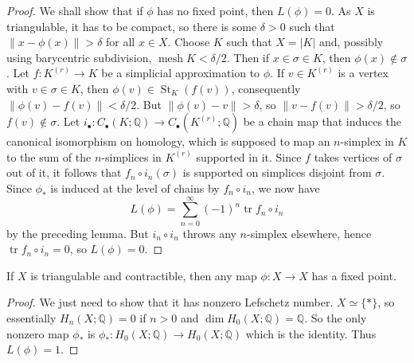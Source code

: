 \begin{proof}
    We shall show that if $\phi$ has no fixed point, then $L(\phi)=0$.
    As $X$ is triangulable, it has to be compact, so there is some $\delta>0$ such that $\|x-\phi(x)\|>\delta$ for all $x\in X$.
    Choose $K$ such that $X=|K|$ and, possibly using barycentric subdivision, $\operatorname{mesh}K<\delta/2$.
    Then if $x\in\sigma\in K$, then $\phi(x)\notin\sigma$.
    Let $f:K^{(r)}\to K$ be a simplicial approximation to $\phi$.
    If $v\in K^{(r)}$ is a vertex with $v\in\sigma\in K$, then $\phi(v)\in\operatorname{St}_K(f(v))$, consequently $\|\phi(v)-f(v)\|<\delta/2$.
    But $\|\phi(v)-v\|>\delta$, so $\|v-f(v)\|>\delta/2$, so $f(v)\notin\sigma$.
    Let $i_\bullet:C_\bullet(K;\mathbb Q)\to C_\bullet(K^{(r)};\mathbb Q)$ be a chain map that induces the canonical isomorphism on homology, which is supposed to map an $n$-simplex in $K$ to the sum of the $n$-simplices in $K^{(r)}$ supported in it.
    Since $f$ takes vertices of $\sigma$ out of it, it follows that $f_n\circ i_n(\sigma)$ is supported on simplices disjoint from $\sigma$.\\
    Since $\phi_\ast$ is induced at the level of chains by $f_n\circ i_n$, we now have
    $$L(\phi)=\sum_{n=0}^\infty(-1)^n\operatorname{tr}f_n\circ i_n$$
    by the preceding lemma.
    But $i_n\circ i_n$ throws any $n$-simplex elsewhere, hence $\operatorname{tr}f_n\circ i_n=0$, so $L(\phi)=0$.
\end{proof}
\begin{corollary}
    If $X$ is triangulable and contractible, then any map $\phi:X\to X$ has a fixed point.
\end{corollary}
\begin{proof}
    We just need to show that it has nonzero Lefschetz number.
    $X\simeq\{\ast\}$, so essentially $H_n(X;\mathbb Q)=0$ if $n>0$ and $\dim H_0(X;\mathbb Q)=\mathbb Q$.
    So the only nonzero map $\phi_\ast$ is $\phi_\ast:H_0(X;\mathbb Q)\to H_0(X;\mathbb Q)$ which is the identity.
    Thus $L(\phi)=1$.
\end{proof}